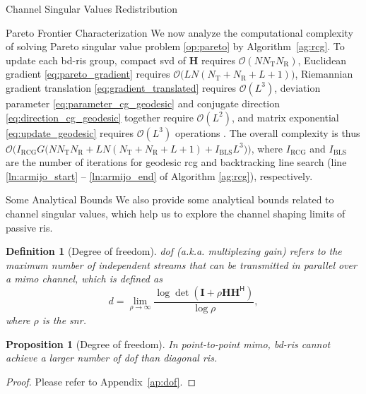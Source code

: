\documentclass[journal]{IEEEtran}
\newtheorem{definition}{Definition}
\newtheorem{proposition}{Proposition}
\begin{document}
\begin{section}{Channel Singular Values Redistribution}
\begin{subsection}{Pareto Frontier Characterization}
		We now analyze the computational complexity of solving Pareto singular value problem \eqref{op:pareto} by Algorithm~\ref{ag:rcg}.
		To update each \gls{bd}-\gls{ris} group, compact \gls{svd} of $\mathbf{H}$ requires $\mathcal{O}(N N_\mathrm{T} N_\mathrm{R})$, Euclidean gradient \eqref{eq:pareto_gradient} requires $\mathcal{O}\bigl(L N (N_\mathrm{T}+N_\mathrm{R}+L+1) \bigr)$, Riemannian gradient translation \eqref{eq:gradient_translated} requires $\mathcal{O}(L^3)$, deviation parameter \eqref{eq:parameter_cg_geodesic} and conjugate direction \eqref{eq:direction_cg_geodesic} together require $\mathcal{O}(L^2)$, and matrix exponential \eqref{eq:update_geodesic} requires $\mathcal{O}(L^3)$ operations \cite{Moler2003}.
		The overall complexity is thus $\mathcal{O}\bigl(I_\text{RCG} G \bigl(N N_\mathrm{T} N_\mathrm{R} + L N (N_\mathrm{T}+N_\mathrm{R}+L+1) + I_\text{BLS} L^3\bigr)\bigr)$, where $I_\text{RCG}$ and $I_\text{BLS}$ are the number of iterations for geodesic \gls{rcg} and backtracking line search (line \ref{ln:armijo_start} -- \ref{ln:armijo_end} of Algorithm \ref{ag:rcg}), respectively.
	\end{subsection}

	\begin{subsection}{Some Analytical Bounds}\label{sc:bounds}
		We also provide some analytical bounds related to channel singular values, which help us to explore the channel shaping limits of passive \gls{ris}.

		\begin{definition}[Degree of freedom]
			\gls{dof} (a.k.a. multiplexing gain) refers to the maximum number of independent streams that can be transmitted in parallel over a \gls{mimo} channel, which is defined as
			\begin{equation}
				d = \lim_{\rho \to \infty} \frac{\log \det(\mathbf{I} + \rho \mathbf{H} \mathbf{H}^\mathsf{H})}{\log \rho},
			\end{equation}
			where $\rho$ is the \gls{snr}.

		\end{definition}

		\begin{proposition}[Degree of freedom]\label{pp:dof}
			In point-to-point \gls{mimo}, \gls{bd}-\gls{ris} cannot achieve a larger number of \gls{dof} than diagonal \gls{ris}.
		\end{proposition}
		\begin{proof}
			Please refer to Appendix~\ref{ap:dof}.
		\end{proof}


\end{subsection}
\end{section}
\end{document}
